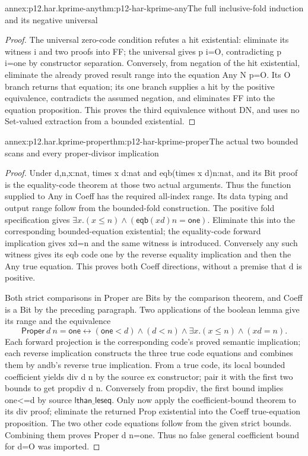 \begin{annexitem}{annex:p12.har.kprime-any}{thm:p12-har-kprime-any}{The full inclusive-fold induction and its negative universal}
\begin{proof}
The universal zero-code condition refutes a hit existential: eliminate
its witness i and two proofs into FF; the universal gives p i=O,
contradicting p i=one by constructor separation. Conversely, from
negation of the hit existential, eliminate the already proved result
range into the equation Any N p=O. Its O branch returns that equation;
its one branch supplies a hit by the positive equivalence, contradicts
the assumed negation, and eliminates FF into the equation proposition.
This proves the third equivalence without DN, and uses no Set-valued
extraction from a bounded existential.
\end{proof}
\end{annexitem}

\begin{annexitem}{annex:p12.har.kprime-proper}{thm:p12-har-kprime-proper}{The actual two bounded scans and every proper-divisor implication}
\begin{proof}
Under d,n,x:nat, times x d:nat and eqb(times x d)n:nat, and its
Bit proof is the equality-code theorem at those two actual arguments.
Thus the function supplied to Any in Coeff has the required all-index
range. Its data typing and output range follow from the bounded-fold
construction. The positive fold specification gives
\(\exists x.(x\le n)\wedge(\mathsf{eqb}(xd)n=\mathsf{one})\).
Eliminate this into the corresponding bounded-equation existential;
the equality-code forward implication gives xd=n and the same witness
is introduced. Conversely any such witness gives its eqb code one by
the reverse equality implication and then the Any true equation.
This proves both Coeff directions, without a premise that d is positive.

Both strict comparisons in Proper are Bits by the comparison theorem,
and Coeff is a Bit by the preceding paragraph. Two applications of
the boolean lemma give its range and the equivalence
\[
 \mathsf{Proper}\ d\ n=\mathsf{one}
 \leftrightarrow
 (\mathsf{one}<d)\wedge(d<n)\wedge
                     \exists x.(x\le n)\wedge(xd=n).
\]
Each forward projection is the corresponding code's proved semantic
implication; each reverse implication constructs the three true code
equations and combines them by andb's reverse true implication.
From a true code, its local bounded coefficient yields div d n by
the source ex constructor; pair it with the first two bounds to get
propdiv d n. Conversely from propdiv, the first bound implies one<=d
by source \(\mathsf{lthan\_leseq}\). Only now apply the coefficient-bound theorem
to its div proof; eliminate the returned Prop existential into the
Coeff true-equation proposition. The two other code equations follow
from the given strict bounds. Combining them proves Proper d n=one.
Thus no false general coefficient bound for d=O was imported.


\end{proof}
\end{annexitem}
